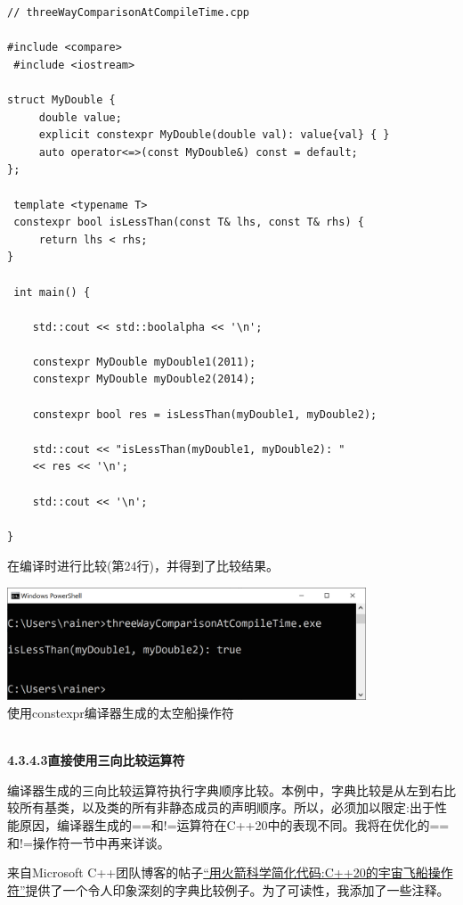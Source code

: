 \begin{lstlisting}[style=styleCXX]
// threeWayComparisonAtCompileTime.cpp

#include <compare>
 #include <iostream>

struct MyDouble {
	 double value;
	 explicit constexpr MyDouble(double val): value{val} { }
	 auto operator<=>(const MyDouble&) const = default;
};

 template <typename T>
 constexpr bool isLessThan(const T& lhs, const T& rhs) {
	 return lhs < rhs;
}

 int main() {
	
	std::cout << std::boolalpha << '\n';
	
	constexpr MyDouble myDouble1(2011);
	constexpr MyDouble myDouble2(2014);
	
	constexpr bool res = isLessThan(myDouble1, myDouble2);
	
	std::cout << "isLessThan(myDouble1, myDouble2): "
	<< res << '\n';
	
	std::cout << '\n';

}
\end{lstlisting}

在编译时进行比较(第24行)，并得到了比较结果。

\begin{center}
\includegraphics[width=0.8\textwidth]{content/3/chapter4/images/30.png}\\
使用constexpr编译器生成的太空船操作符
\end{center}

\hspace*{\fill} \\ %
\noindent
\textbf{4.3.4.3\hspace{0.2cm}直接使用三向比较运算符}

编译器生成的三向比较运算符执行字典顺序比较。本例中，字典比较是从左到右比较所有基类，以及类的所有非静态成员的声明顺序。所以，必须加以限定:出于性能原因，编译器生成的==和!=运算符在C++20中的表现不同。我将在优化的==和!=操作符一节中再来详谈。

来自Microsoft C++团队博客的帖子\href{https://devblogs.microsoft.com/cppblog/simplify-your-code-with-rocket-science-c20s-spaceship-operator/}{“用火箭科学简化代码:C++20的宇宙飞船操作符”}提供了一个令人印象深刻的字典比较例子。为了可读性，我添加了一些注释。

